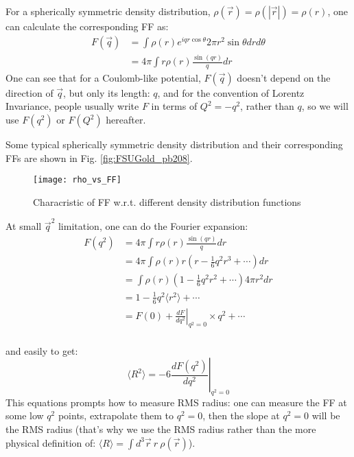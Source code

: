 For a spherically symmetric density distribution, 
$\rho(\vec{r}) = \rho({|\vec{r}|}) = \rho(r)$, 
one can calculate the corresponding FF as:
\begin{equation*}
    \begin{aligned}
	F(\vec{q}) &= \int \rho(r) e^{iqr\cos\theta} 2\pi r^2 \sin\theta dr d\theta	\\
	    &= 4\pi \int r \rho(r) \frac{\sin{(qr)}}{q} dr
    \end{aligned}
\end{equation*}
One can see that for a Coulomb-like potential, $F(\vec{q})$ doesn't depend on
the direction of $\vec{q}$, but only its length: $q$, and for the convention 
of Lorentz Invariance, people usually write $F$ in terms of $Q^2 = -q^2$, rather
than $q$, so we will use $F(q^2)$ or $F(Q^2)$ hereafter.

Some typical spherically symmetric density distribution and their 
corresponding FFs are shown in Fig. \ref{fig:FSUGold_pb208}.
\begin{figure}
    \texttt{[image: rho\_vs\_FF]}
    \caption{Characristic of FF w.r.t. different density distribution functions}
\end{figure}

At small $\vec{q}^2$ limitation, one can do the Fourier expansion:
\begin{equation*}
    \begin{aligned}
	F(q^2) &= 4\pi \int r \rho(r) \frac{\sin{(qr)}}{q} dr \\
	    &= 4\pi \int \rho(r) r \left( r - \frac{1}{6} q^2r^3 + \cdots \right) dr	\\
	    &= \int \rho(r)  \left( 1 - \frac{1}{6} q^2r^2 + \cdots \right) 4\pi r^2 dr	\\
	    &= 1 - \frac{1}{6}q^2\langle r^2 \rangle + \cdots \\
	    &= F(0) + \left.\frac{dF}{dq^2}\right|_{q^2=0} \times q^2 + \cdots	\\
    \end{aligned}
\end{equation*}

and easily to get:
\begin{equation}
    \langle R^2 \rangle = -6 \left. \frac{dF(q^2)}{dq^2} \right|_{q^2 = 0}
\end{equation}
This equations prompts how to measure RMS radius:
one can measure the FF at some low $q^2$ points, extrapolate them 
to $q^2 = 0$, then the slope at $q^2 = 0$ will be the RMS radius (that's why
we use the RMS radius rather than the more physical definition of: 
$\langle R \rangle = \int d^3\vec{r} \ r \ \rho(\vec{r})$).

